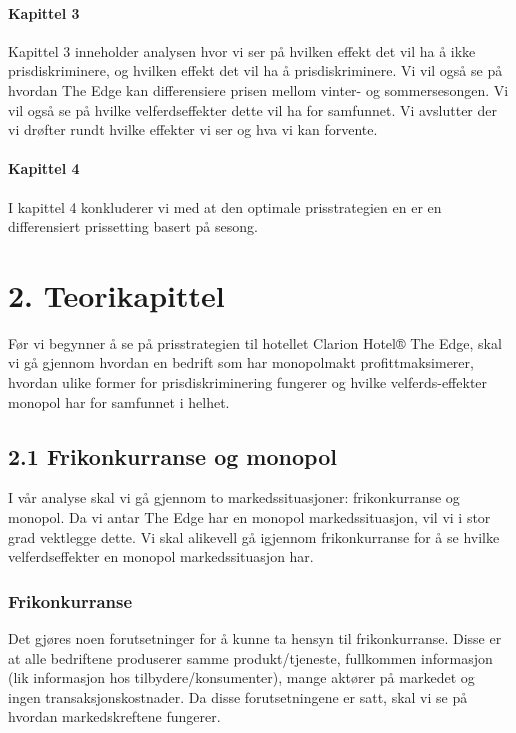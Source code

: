 \documentclass[
  12pt,
  a4paper,
  DIV=11,
  numbers=noendperiod]{scrartcl}
\let\oldparagraph\paragraph
\renewcommand{\paragraph}[1]{\oldparagraph{#1}\mbox{}}
\begin{document}
\paragraph{Kapittel 3}\label{kapittel-3}

Kapittel 3 inneholder analysen hvor vi ser på hvilken effekt det vil ha
å ikke prisdiskriminere, og hvilken effekt det vil ha å
prisdiskriminere. Vi vil også se på hvordan The Edge kan differensiere
prisen mellom vinter- og sommersesongen. Vi vil også se på hvilke
velferdseffekter dette vil ha for samfunnet. Vi avslutter der vi drøfter
rundt hvilke effekter vi ser og hva vi kan forvente.

\paragraph{Kapittel 4}\label{kapittel-4}

I kapittel 4 konkluderer vi med at den optimale prisstrategien en er en
differensiert prissetting basert på sesong.

\clearpage

\section{2. Teorikapittel}\label{teorikapittel}

Før vi begynner å se på prisstrategien til hotellet Clarion Hotel® The
Edge, skal vi gå gjennom hvordan en bedrift som har monopolmakt
profittmaksimerer, hvordan ulike former for prisdiskriminering fungerer
og hvilke velferds-effekter monopol har for samfunnet i helhet.

\subsection{2.1 Frikonkurranse og
monopol}\label{frikonkurranse-og-monopol}

I vår analyse skal vi gå gjennom to markedssituasjoner: frikonkurranse
og monopol. Da vi antar The Edge har en monopol markedssituasjon, vil vi
i stor grad vektlegge dette. Vi skal alikevell gå igjennom
frikonkurranse for å se hvilke velferdseffekter en monopol
markedssituasjon har.

\subsubsection{Frikonkurranse}\label{frikonkurranse}

Det gjøres noen forutsetninger for å kunne ta hensyn til frikonkurranse.
Disse er at alle bedriftene produserer samme produkt/tjeneste,
fullkommen informasjon (lik informasjon hos tilbydere/konsumenter),
mange aktører på markedet og ingen transaksjonskostnader. Da disse
forutsetningene er satt, skal vi se på hvordan markedskreftene fungerer.
\end{document}
